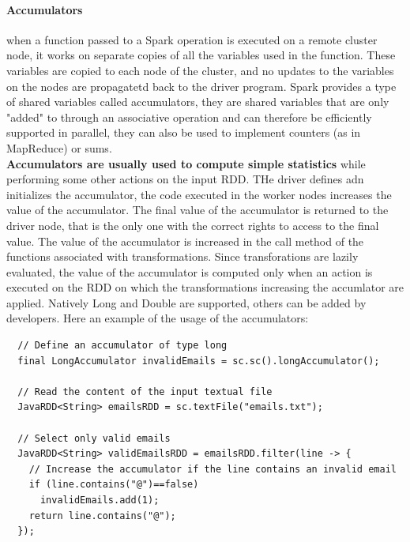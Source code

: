 \documentclass[12pt]{article}
\begin{document}
\paragraph{Accumulators} when a function passed to a Spark operation is executed on a remote cluster node, it works on separate copies of all the variables used in the function. These variables are copied to each node of the cluster, and no updates to the variables on the nodes are propagatetd back to the driver program. Spark provides a type of shared variables called accumulators, they are shared variables that are only "added" to through an associative operation and can therefore be efficiently supported in parallel, they can also be used to implement counters (as in MapReduce) or sums.\\
\textbf{Accumulators are usually used to compute simple statistics} while performing some other actions on the input RDD. THe driver defines adn initializes the accumulator, the code executed in the worker nodes increases the value of the accumulator. The final value of the accumulator is returned to the driver node, that is the only one with the correct rights to access to the final value. The value of the accumulator is increased in the call method of the functions associated with transformations. Since transforations are lazily evaluated, the value of the accumulator is computed only when an action is executed on the RDD on which the transformations increasing the accumlator are applied. Natively Long and Double are supported, others can be added by developers. Here an example of the usage of the accumulators:
\begin{lstlisting}
  // Define an accumulator of type long
  final LongAccumulator invalidEmails = sc.sc().longAccumulator();

  // Read the content of the input textual file
  JavaRDD<String> emailsRDD = sc.textFile("emails.txt");

  // Select only valid emails
  JavaRDD<String> validEmailsRDD = emailsRDD.filter(line -> {
    // Increase the accumulator if the line contains an invalid email
    if (line.contains("@")==false)
      invalidEmails.add(1);
    return line.contains("@");
  });
\end{lstlisting}
\end{document}
